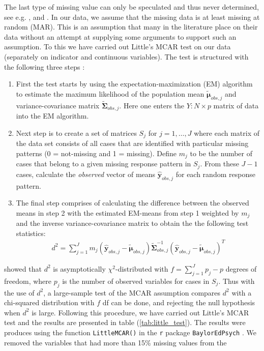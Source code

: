 \documentclass[../thesis.tex]{subfiles}
\begin{document}
\noindent The last type of missing value can only be speculated and thus never determined, see e.g. \cite{rubin1976inference}, \cite{schafer2002missing} and \cite{moons2006using}. In our data, we assume that the missing data is at least missing at random (MAR). This is an assumption that many in the literature place on their data without an attempt at supplying some arguments to support such an assumption. To this we have carried out Little's MCAR test \citep{little1988test} on our data (separately on indicator and continuous variables). The test is structured with the following three steps : 
\begin{enumerate}[label=(\roman*)]
    \item First the test starts by using the expectation-maximization (EM) algorithm \citep{dempster1977maximum} to estimate the maximum likelihood of the population mean $\bm{\tilde{\mu}}_{obs, j}$ and variance-covariance matrix $\bm{\tilde{\Sigma}}_{obs,j}$. Here one enters the $Y:N\times p$ matrix of data into the EM algorithm.
    \item Next step is to create a set of matrices $S_j$ for $j = 1, \hdots, J$ where each matrix of the data set consists of all cases that are identified with particular missing patterns (0 = not-missing and 1 = missing). Define $m_j$ to be the number of cases that belong to a given missing response pattern in $S_j$. From these $J-1$ cases, calculate the \textit{observed} vector of means $\bm{\hat{y}}_{obs, j}$ for each random response pattern. 
    \item The final step comprises of calculating the difference between the observed means in step 2 with the estimated EM-means from step 1 weighted by $m_j$ and the inverse variance-covariance matrix to obtain the the following test statistics:
    \begin{align}
        d^2 = \sum_{j=1}^J m_j \left(\bm{\hat{y}}_{obs, j} -  \bm{\tilde{\mu}}_{obs, j}\right)\bm{\tilde{\Sigma}}_{obs,j}^{-1}\left(\bm{\hat{y}}_{obs, j} -  \bm{\tilde{\mu}}_{obs, j}\right)^T
    \end{align}
\end{enumerate}

\noindent \cite{little1988test} showed that $d^2$ is asymptotically $\chi^2$-distributed with $f = \sum_{j=1}^J p_j - p$ degrees of freedom, where $p_j$ is the number of observed variables for cases in $S_j$. Thus with the use of $d^2$, a large-sample test of the MCAR assumption compares $d^2$ with a chi-squared distribution with $f$ df can be done, and rejecting the null hypothesis when $d^2$ is large. Following this procedure, we have carried out Little's MCAR test and the results are presented in table (\ref{tab:little_test}). The results were produces using the function \texttt{LittleMCAR()} in the \texttt{r} package \texttt{BaylorEdPsych} \citep{BaylorEdPsych}. We removed the variables that had more than 15\% missing values from the
\end{document}

